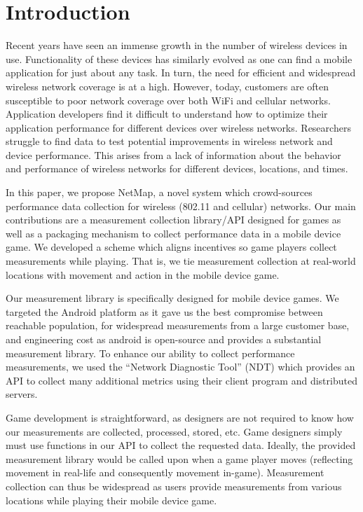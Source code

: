 \section{Introduction}
\label{s:intro}


Recent years have seen an immense growth in the number of wireless devices in use. Functionality of these devices has similarly evolved as one can find a mobile application for just about any task. In turn, the need for efficient and widespread wireless network coverage is at a high. However, today, customers are often susceptible to poor network coverage over both WiFi and cellular networks. Application developers find it difficult to understand how to optimize their application performance for different devices over wireless networks. Researchers struggle to find data to test potential improvements in wireless network and device performance. This arises from a lack of information about the behavior and performance of wireless networks for different devices, locations, and times. 

In this paper, we propose NetMap, a novel system which crowd-sources performance data collection for wireless (802.11 and cellular) networks. Our main contributions are a measurement collection library/API designed for games as well as a packaging mechanism to collect performance data in a mobile device game.  We developed a scheme which aligns incentives so game players collect measurements while playing. That is, we tie measurement collection at real-world locations with movement and action in the mobile device game. 

Our measurement library is specifically designed for mobile device games. We targeted the Android platform as it gave us the best compromise between reachable population, for widespread measurements from a large customer base, and engineering cost as android is open-source and provides a substantial measurement library. To enhance our ability to collect performance measurements, we used the “Network Diagnostic Tool” (NDT) which provides an API to collect many additional metrics using their client program and distributed servers. 

Game development is straightforward, as designers are not required to know how our measurements are collected, processed, stored, etc. Game designers simply must use functions in our API to collect the requested data. Ideally, the provided measurement library would be called upon when a game player moves (reflecting movement in real-life and consequently movement in-game). Measurement collection can thus be widespread as users provide measurements from various locations while playing their mobile device game. 

